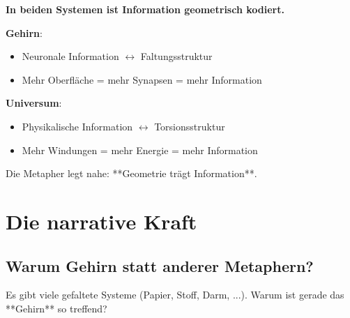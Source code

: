 	\begin{revolutionary}[Information = Geometrie]
		\textbf{In beiden Systemen ist Information geometrisch kodiert.}

		\vspace{0.3cm}

		\textbf{Gehirn}:
		\begin{itemize}
			\item Neuronale Information $\leftrightarrow$ Faltungsstruktur
			\item Mehr Oberfläche = mehr Synapsen = mehr Information
		\end{itemize}

		\textbf{Universum}:
		\begin{itemize}
			\item Physikalische Information $\leftrightarrow$ Torsionsstruktur
			\item Mehr Windungen = mehr Energie = mehr Information
		\end{itemize}

		\vspace{0.3cm}

		Die Metapher legt nahe: **Geometrie trägt Information**.
	\end{revolutionary}

	\section{Die narrative Kraft}

	\subsection{Warum Gehirn statt anderer Metaphern?}

	Es gibt viele gefaltete Systeme (Papier, Stoff, Darm, ...). Warum ist gerade das **Gehirn** so treffend?

